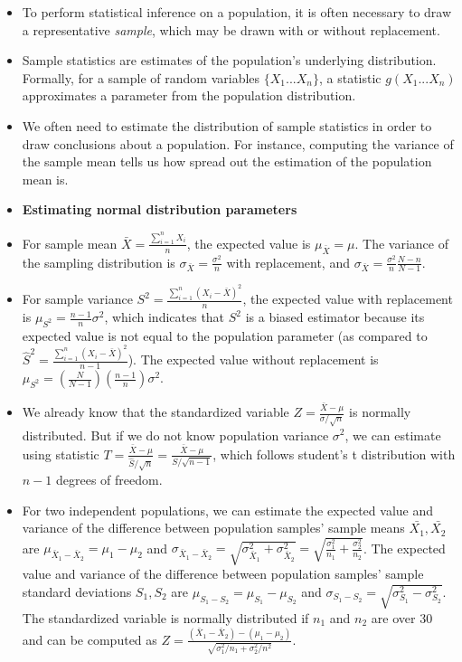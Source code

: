 \documentclass[11pt,letterpaper]{scrartcl}
\begin{document}
\begin{itemize}
\item To perform statistical inference on a population, it is often necessary to draw a representative \emph{sample}, which may be drawn with or without replacement.
\item Sample statistics are estimates of the population's underlying distribution. Formally, for a sample of random variables $\{X_{1} ... X_{n}\}$, a statistic $g(X_{1} ... X_{n})$ approximates a parameter from the population distribution. 
\item We often need to estimate the distribution of sample statistics in order to draw conclusions about a population. For instance, computing the variance of the sample mean tells us how spread out the estimation of the population mean is.
\item \textbf{Estimating normal distribution parameters}
\item For sample mean $\bar{X}=\frac{\sum_{i=1}^{n}X_{i}}{n}$, the expected value is $\mu_{\bar{X}}=\mu$. The variance of the sampling distribution is $\sigma_{\bar{X}} = \frac{\sigma^{2}}{n}$ with replacement, and $\sigma_{\bar{X}} = \frac{\sigma^{2}}{n}\frac{N-n}{N-1}$. 
\item For sample variance $S^{2} = \frac{\sum_{i=1}^{n}(X_{i}-\bar{X})^{2}}{n}$, the expected value with replacement is $\mu_{S^{2}} = \frac{n-1}{n}\sigma^{2}$, which indicates that $S^{2}$ is a biased estimator because its expected value is not equal to the population parameter (as compared to $\hat{S}^{2} = \frac{\sum_{i=1}^{n}(X_{i}-\bar{X})^{2}}{n-1}$). The expected value without replacement is $\mu_{S^{2}} = (\frac{N}{N-1})(\frac{n-1}{n})\sigma^{2}$.
\item We already know that the standardized variable $Z=\frac{\bar{X}-\mu}{\sigma / \sqrt{n}}$ is normally distributed. But if we do not know population variance $\sigma^{2}$, we can estimate using statistic $T = \frac{\bar{X} - \mu}{\hat{S} / \sqrt{n}} = \frac{\bar{X} - \mu}{S / \sqrt{n-1}}$, which follows student's t distribution with $n-1$ degrees of freedom.
\item For two independent populations, we can estimate the expected value and variance of the difference between population samples' sample means $\bar{X_{1}}, \bar{X_{2}}$ are $\mu_{\bar{X}_{1} - \bar{X}_{2}} = \mu_{1} - \mu_{2}$ and $\sigma_{\bar{X}_{1} - \bar{X}_{2}} = \sqrt{\sigma^{2}_{\bar{X}_{1}} + \sigma^{2}_{\bar{X}_{2}}} = \sqrt{\frac{\sigma_{1}^{2}}{n_{1}} + \frac{\sigma_{2}^{2}}{n_{2}}}$. The expected value and variance of the difference between population samples' sample standard deviations $S_{1}, S_{2}$ are $\mu_{S_{1} - S_{2}} = \mu_{S_{1}} - \mu_{S_{2}}$ and $\sigma_{S_{1} - S_{2}} = \sqrt{\sigma^{2}_{S_{1}} - \sigma^{2}_{S_{2}}}$. The standardized variable is normally distributed if $n_{1}$ and $n_{2}$ are over 30 and can be computed as $Z=\frac{(\bar{X}_{1} - \bar{X}_{2}) - (\mu_{1} - \mu_{2})}{\sqrt{\sigma_{1}^{2} / n_{1} + \sigma_{2}^{2} / n^{2}}}$.

\end{itemize}
\end{document}
